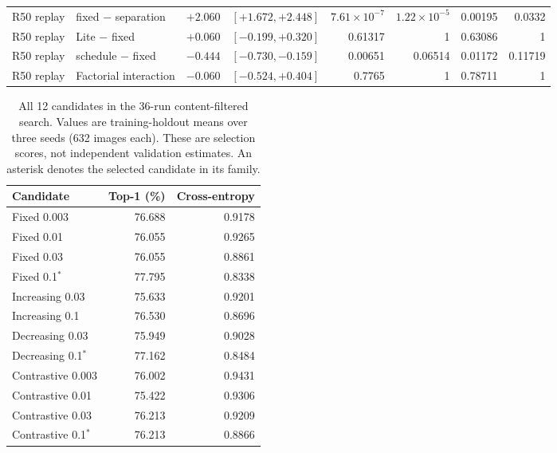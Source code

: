 \documentclass[10pt,a4paper,twocolumn]{article}
\begin{document}
\begin{table}[tbp]
\begin{tabular*}{\textwidth}{@{\extracolsep{\fill}}llrrrrrr@{}}
R50 replay & fixed $-$ separation & $+2.060$ & $[+1.672,+2.448]$ & $7.61\!\times\!10^{-7}$ & $1.22\!\times\!10^{-5}$ & 0.00195 & 0.0332 \\
R50 replay & Lite $-$ fixed & $+0.060$ & $[-0.199,+0.320]$ & 0.61317 & 1 & 0.63086 & 1 \\
R50 replay & schedule $-$ fixed & $-0.444$ & $[-0.730,-0.159]$ & 0.00651 & 0.06514 & 0.01172 & 0.11719 \\
R50 replay & Factorial interaction & $-0.060$ & $[-0.524,+0.404]$ & 0.7765 & 1 & 0.78711 & 1 \\
\bottomrule
\end{tabular*}
\end{table}

\begin{table}[tbp]
\caption{All 12 candidates in the 36-run content-filtered search.
Values are training-holdout means over three seeds (632 images each).
These are selection scores, not independent validation estimates.
An asterisk denotes the selected candidate in its family.}
\label{tab:solid_selection}
\centering\footnotesize
\begin{tabular*}{\linewidth}{@{\extracolsep{\fill}}lrr@{}}
\toprule
Candidate & Top-1 (\%) & Cross-entropy \\
\midrule
Fixed 0.003 & 76.688 & 0.9178 \\
Fixed 0.01 & 76.055 & 0.9265 \\
Fixed 0.03 & 76.055 & 0.8861 \\
Fixed 0.1$^*$ & 77.795 & 0.8338 \\
\midrule
Increasing 0.03 & 75.633 & 0.9201 \\
Increasing 0.1 & 76.530 & 0.8696 \\
Decreasing 0.03 & 75.949 & 0.9028 \\
Decreasing 0.1$^*$ & 77.162 & 0.8484 \\
\midrule
Contrastive 0.003 & 76.002 & 0.9431 \\
Contrastive 0.01 & 75.422 & 0.9306 \\
Contrastive 0.03 & 76.213 & 0.9209 \\
Contrastive 0.1$^*$ & 76.213 & 0.8866 \\
\bottomrule
\end{tabular*}
\end{table}
\end{document}
